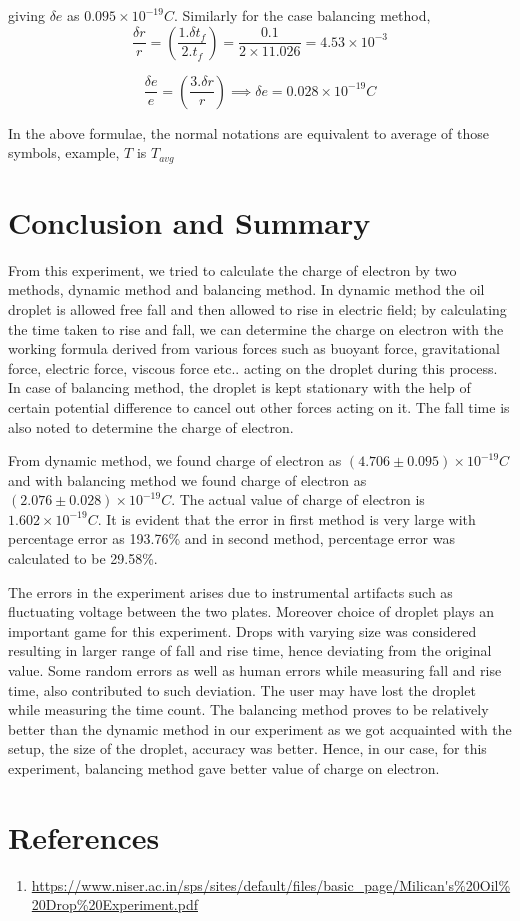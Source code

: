 \documentclass[a4paper, amsfonts, amssymb, amsmath, reprint, showkeys, nofootinbib, twoside]{revtex4-1}
\begin{document}
giving $\delta e$ as $0.095\times10^{-19} C.$
\newline
\newline
Similarly for the case balancing method, 
\begin{equation}
	\frac{\delta r}{r}= \left(\frac{1.\delta t_f}{2.t_f}\right)=\frac{0.1}{2\times11.026}=4.53\times10^{-3}
\end{equation}

\begin{equation}
	\frac{\delta e}{e}= \left(\frac{3.\delta r}{r}\right)\implies \delta e =0.028\times10^{-19} C
\end{equation}

In the above formulae, the normal notations are equivalent to average of those symbols, example, $T$ is $T_{avg}$

\section{Conclusion and Summary}

From this experiment, we tried to calculate the charge of electron by two methods, dynamic method and balancing method. In dynamic method the oil droplet is allowed free fall and then allowed to rise in electric field; by calculating the time taken to rise and fall, we can determine the charge on electron with the working formula derived from various forces such as buoyant force, gravitational force, electric force, viscous force etc.. acting on the droplet during this process. In case of balancing method, the droplet is kept stationary with the help of certain potential difference to cancel out other forces acting on it. The fall time is also noted to determine the charge of electron. 

From dynamic method, we found charge of electron as $(4.706\pm0.095)\times10^{-19} C$ and with balancing method we found charge of electron as $(2.076\pm0.028)\times10^{-19} C$. The actual value of charge of electron is $1.602\times10^{-19} C$. It is evident that the error in first method is very large with percentage error as 193.76\% and in second method, percentage error was calculated to be 29.58\%.

The errors in the experiment arises due to instrumental artifacts such as fluctuating voltage between the two plates. Moreover choice of droplet plays an important game for this experiment. Drops with varying size was considered resulting in larger range of fall and rise time, hence deviating from the original value. Some random errors as well as human errors while measuring fall and rise time, also contributed to such deviation. The user may have lost the droplet while measuring the time count. The balancing method proves to be relatively better than the dynamic method in our experiment as we got acquainted with the setup, the size of the droplet, accuracy was better. Hence, in our case, for this experiment, balancing method gave better value of charge on electron.


\section{References}
\begin{enumerate}
\item {\url{https://www.niser.ac.in/sps/sites/default/files/basic_page/Milican's%20Oil%20Drop%20Experiment.pdf}}
\end{enumerate}
\end{document}
